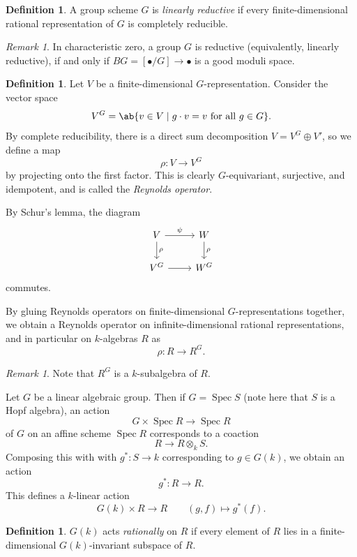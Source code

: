\documentclass{amsart}
\theoremstyle{definition}
\newtheorem{defn}[thm]{Definition}
\theoremstyle{remark}
\newtheorem{rmk}[thm]{Remark}
\theoremstyle{plain}
\theoremstyle{definition}
\theoremstyle{remark}
\newcommand{\1}{\mathbf{1}}
\newcommand{\2}{\mathbf{2}}
\newcommand{\3}{\mathbf{3}}
\DeclareMathOperator{\Spec}{Spec}
\begin{document}
\begin{defn}
    A group scheme \(G\) is \textit{linearly reductive} if every finite-dimensional rational representation of \(G\) is completely reducible.
\end{defn}

\begin{rmk}
    In characteristic zero, a group \(G\) is reductive (equivalently, linearly reductive), if and only if \(BG = [\bullet / G] \to \bullet \) is a good moduli space.
\end{rmk}

\begin{defn}
    Let \(V\) be a finite-dimensional \(G\)-representation. Consider the vector space
    \[ V^G = \ab\{ v \in V \mid g \cdot v = v \text{ for all } g \in G \}. \]
    By complete reducibility, there is a direct sum decomposition \(V = V^G \oplus V'\), so we define a map
    \[ \rho \colon V \to V^G \]
    by projecting onto the first factor. This is clearly \(G\)-equivariant, surjective, and idempotent, and is called the \textit{Reynolds operator}.
\end{defn}

By Schur's lemma, the diagram
\begin{equation*}
\begin{tikzcd}
    V \ar{r}{\psi} \ar{d}{\rho} & W \ar{d}{\rho} \\
    V^G \ar{r} & W^G
\end{tikzcd}
\end{equation*}
commutes. 

By gluing Reynolds operators on finite-dimensional \(G\)-representations together, we obtain a Reynolds operator on infinite-dimensional rational representations, and in particular on \(k\)-algebras \(R\) as 
\[ \rho \colon R \to R^G. \]

\begin{rmk}
    Note that \(R^G\) is a \(k\)-subalgebra of \(R\).
\end{rmk}


Let \(G\) be a linear algebraic group. Then if \(G = \Spec S\) (note here that \(S\) is a Hopf algebra), an action 
\[ G \times \Spec R \to \Spec R \]
of \(G\) on an affine scheme \(\Spec R\) corresponds to a coaction
\[ R \to R \otimes_k S. \]
Composing this with with \(g^* \colon S \to k\) corresponding to \(g \in G(k)\), we obtain an action
\[ g^* \colon R \to R. \]
This defines a \(k\)-linear action
\[ G(k) \times R \to R \qquad (g, f) \mapsto g^*(f). \]

\begin{defn}
    \(G(k)\) acts \textit{rationally} on \(R\) if every element of \(R\) lies in a finite-dimensional \(G(k)\)-invariant subspace of \(R\).
\end{defn}
\end{document}
